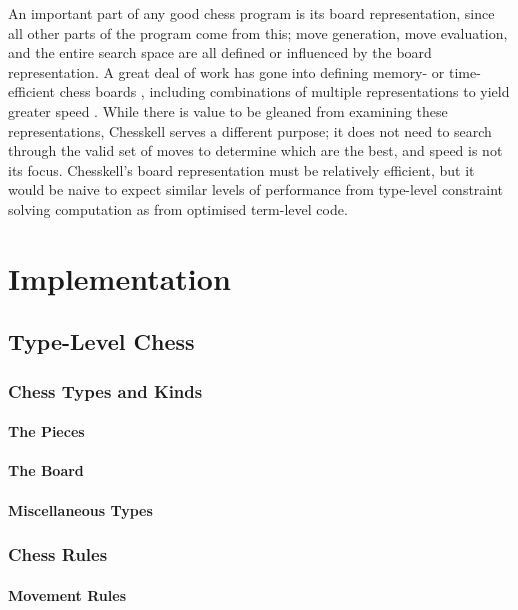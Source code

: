 \documentclass[12pt, a4paper, bibliography=totocnumbered]{scrreprt}
\begin{document}
An important part of any good chess program is its board representation, since all other parts of the program come from this; move generation, move evaluation, and the entire search space are all defined or influenced by the board representation. A great deal of work has gone into defining memory- or time-efficient chess boards \cite{bitboard} \cite{searchtables}, including combinations of multiple representations to yield greater speed \cite{bitandccr}. While there is value to be gleaned from examining these representations, Chesskell serves a different purpose; it does not need to search through the valid set of moves to determine which are the best, and speed is not its focus. Chesskell's board representation must be relatively efficient, but it would be naive to expect similar levels of performance from type-level constraint solving computation as from optimised term-level code.


\chapter{Implementation}

\section{Type-Level Chess}

\subsection{Chess Types and Kinds}

\subsubsection{The Pieces}

\subsubsection{The Board}

\subsubsection{Miscellaneous Types}

\subsection{Chess Rules}

\subsubsection{Movement Rules}
\end{document}
